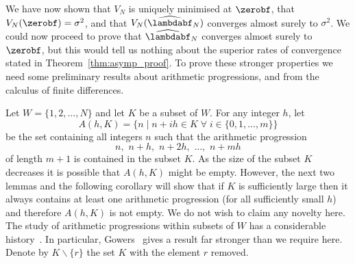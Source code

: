 \documentclass[journal]{IEEEtran}
\begin{document}

We have now shown that $V_N$ is uniquely minimised at $\zerobf$, that $V_N(\zerobf) = \sigma^2$, and that $V_N(\widehat{\lambdabf}_N)$ converges almost surely to $\sigma^2$.  We could now proceed to prove that $\widehat{\lambdabf}_N$ converges almost surely to $\zerobf$, but this would tell us nothing about the superior rates of convergence stated in Theorem~\ref{thm:asymp_proof}.  To prove these stronger properties we need some preliminary results about arithmetic progressions, and from the calculus of finite differences.
 
Let $W = \{1,2,\dots, N\}$ and let $K$ be a subset of $W$.  For any integer $h$, let
\begin{equation} \label{eq:S(h,G)def} 
A(h,K) = \big\{ n \mid n + ih \in K \;\forall\; i \in \{0,1,\dots,m\} \big\}
\end{equation}
be the set containing all integers $n$ such that the arithmetic progression
\[
n, \,\, n + h, \,\, n + 2h, \,\, \dots, \,\, n + mh
\]
of length $m+1$ is contained in the subset $K$.  As the size of the subset $K$ decreases it is possible that $A(h,K)$ might be empty. However, the next two lemmas and the following corollary will show that if $K$ is sufficiently large then it always contains at least one arithmetic progression (for all sufficiently small $h$) and therefore $A(h,K)$ is not empty. We do not wish to claim any novelty here.  The study of arithmetic progressions within subsets of $W$ has a considerable history~\cite{Erdos_on_some_sequence_of_integers1936,Szemeredi_setint_no_k_arth1975,Gowers_new_proof2001}.  In particular, Gowers~\cite[Theorem 1.3]{Gowers_new_proof2001} gives a result far stronger than we require here.  Denote by $K \backslash \{r\}$ the set $K$ with the element $r$ removed.
\end{document}
